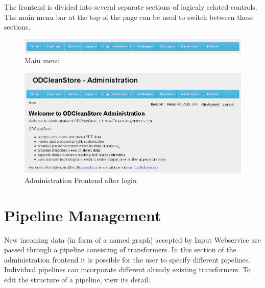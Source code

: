 The frontend is divided into several separate sections of logicaly related controls. The main menu bar at the top of the page can be used to switch between those sections.

\begin{figure}[tb]
    \centering
    \includegraphics[width=\textwidth]{images/fe-main-menu-bar.png}
    \caption{Main menu}
	\label{fig:feHome}
\end{figure}

\begin{figure}[tb]
    \centering
    \includegraphics[width=\textwidth]{images/fe-home-screenshot.png}
    \caption{Administration Frontend after login}
	\label{fig:feHome}
\end{figure}

\section{Pipeline Management}
\label{sec:pipelineManagement}

	New incoming data (in form of a named graph) accepted by Input Webservice are passed through a {pipeline} consisting of {transformers}. In this section of the administration frontend it is possible for the user to specify different {pipelines}. Individual {pipelines} can incorporate different already existing {transformers}. To edit the structure of a {pipeline}, view its detail.

